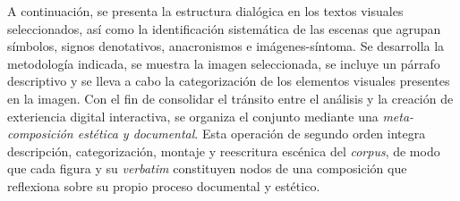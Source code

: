 A continuación, se presenta la estructura dialógica en los textos visuales seleccionados, así como la identificación sistemática de las escenas que agrupan símbolos, signos denotativos, anacronismos e imágenes-síntoma. Se desarrolla la metodología indicada, se muestra la imagen seleccionada, se incluye un párrafo descriptivo y se lleva a cabo la categorización de los elementos visuales presentes en la imagen. \textcolor{edit30sept}{Con el fin de consolidar el tránsito entre el análisis y la creación de exteriencia digital interactiva, se organiza el conjunto mediante una \textit{meta-composición estética y documental}. Esta operación de segundo orden integra descripción, categorización, montaje y reescritura escénica del \textit{corpus}, de modo que cada figura y su \textit{verbatim} constituyen nodos de una composición que reflexiona sobre su propio proceso documental y estético.}

